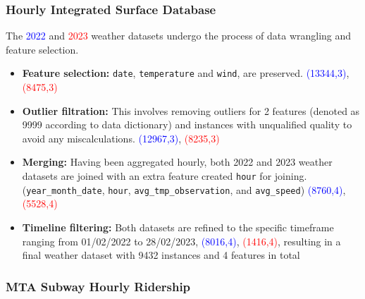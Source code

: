 \documentclass[11pt]{article}
\begin{document}

 \subsubsection{Hourly Integrated Surface Database}

 The \textcolor{blue}{2022} and \textcolor{red}{2023} weather datasets undergo the process of data wrangling and feature selection. 

 \begin{itemize}
     \item \textbf{Feature selection:} \texttt{date}, \texttt{temperature} and \texttt{wind}, are preserved. \textcolor{blue}{(13344,3)}, \textcolor{red}{(8475,3)}

      \item \textbf{Outlier filtration:} This involves removing outliers for 2 features (denoted as 9999 according to data dictionary) and instances with unqualified quality to avoid any miscalculations. \textcolor{blue}{(12967,3)}, \textcolor{red}{(8235,3)}

     \item \textbf{Merging:} Having been aggregated hourly, both 2022 and 2023 weather datasets are joined with an extra feature created \texttt{hour} for joining.  (\texttt{year\_month\_date}, \texttt{hour}, \texttt{avg\_tmp\_observation}, and \texttt{avg\_speed}) \textcolor{blue}{(8760,4)}, \textcolor{red}{(5528,4)}

      \item \textbf{Timeline filtering:} Both datasets are refined to the specific timeframe ranging from 01/02/2022 to 28/02/2023, \textcolor{blue}{(8016,4)}, \textcolor{red}{(1416,4)}, resulting in a final weather dataset with 9432 instances and 4 features in total
     
 \end{itemize}


 \subsubsection{MTA Subway Hourly Ridership}
\end{document}
